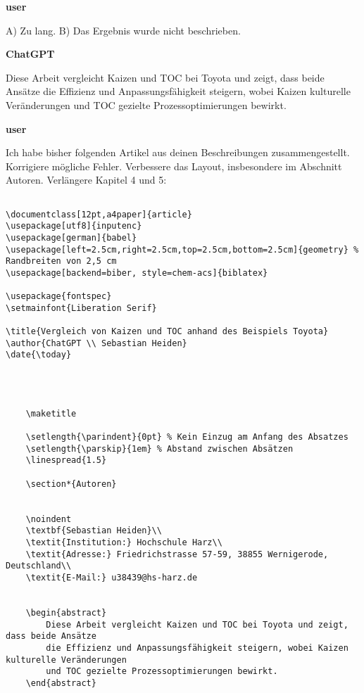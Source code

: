 \textbf{user}

A) Zu lang. B) Das Ergebnis wurde nicht beschrieben.

\textbf{ChatGPT}

Diese Arbeit vergleicht Kaizen und TOC bei Toyota und zeigt, dass beide Ansätze die Effizienz und Anpassungsfähigkeit steigern, wobei Kaizen kulturelle Veränderungen und TOC gezielte Prozessoptimierungen bewirkt.

\textbf{user}

Ich habe bisher folgenden Artikel aus deinen Beschreibungen zusammengestellt. Korrigiere mögliche Fehler. Verbessere das Layout, insbesondere im Abschnitt Autoren. Verlängere Kapitel 4 und 5:

\begin{verbatim}

\documentclass[12pt,a4paper]{article}
\usepackage[utf8]{inputenc}
\usepackage[german]{babel}
\usepackage[left=2.5cm,right=2.5cm,top=2.5cm,bottom=2.5cm]{geometry} % Randbreiten von 2,5 cm
\usepackage[backend=biber, style=chem-acs]{biblatex}

\usepackage{fontspec}
\setmainfont{Liberation Serif}

\title{Vergleich von Kaizen und TOC anhand des Beispiels Toyota}
\author{ChatGPT \\ Sebastian Heiden}
\date{\today}



	
	\maketitle
	
	\setlength{\parindent}{0pt} % Kein Einzug am Anfang des Absatzes
	\setlength{\parskip}{1em} % Abstand zwischen Absätzen
	\linespread{1.5}
	
	\section*{Autoren}
	
	
	\noindent
	\textbf{Sebastian Heiden}\\
	\textit{Institution:} Hochschule Harz\\
	\textit{Adresse:} Friedrichstrasse 57-59, 38855 Wernigerode, Deutschland\\
	\textit{E-Mail:} u38439@hs-harz.de
	
	
	\begin{abstract}
		Diese Arbeit vergleicht Kaizen und TOC bei Toyota und zeigt, dass beide Ansätze
		die Effizienz und Anpassungsfähigkeit steigern, wobei Kaizen kulturelle Veränderungen
		und TOC gezielte Prozessoptimierungen bewirkt.
	\end{abstract}
	

\end{verbatim}
